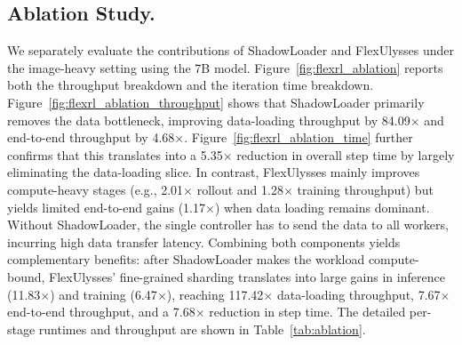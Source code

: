 
\subsection{Ablation Study.} 

We separately evaluate the contributions of ShadowLoader and FlexUlysses under the image-heavy setting using the 7B model. Figure~\ref{fig:flexrl_ablation} reports both the throughput breakdown and the iteration time breakdown. Figure~\ref{fig:flexrl_ablation_throughput} shows that ShadowLoader primarily removes the data bottleneck, improving data-loading throughput by 84.09$\times$ and end-to-end throughput by 4.68$\times$. Figure~\ref{fig:flexrl_ablation_time} further confirms that this translates into a 5.35$\times$ reduction in overall step time by largely eliminating the data-loading slice. In contrast, FlexUlysses mainly improves compute-heavy stages (e.g., 2.01$\times$ rollout and 1.28$\times$ training throughput) but yields limited end-to-end gains (1.17$\times$) when data loading remains dominant. Without ShadowLoader, the single controller has to send the data to all workers, incurring high data transfer latency. Combining both components yields complementary benefits: after ShadowLoader makes the workload compute-bound, FlexUlysses' fine-grained sharding translates into large gains in inference (11.83$\times$) and training (6.47$\times$), reaching 117.42$\times$ data-loading throughput, 7.67$\times$ end-to-end throughput, and a 7.68$\times$ reduction in step time. The detailed per-stage runtimes and throughput are shown in Table~\ref{tab:ablation}. %


